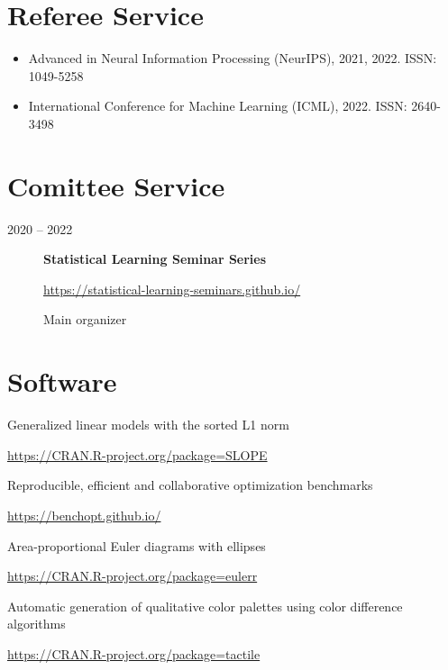 \documentclass[
  10pt,
  headsepline=true,
  english,
  DIV=12
]{scrartcl}
\renewcommand*{%
  \mkbibnamegiven
}[1]{\ifitemannotation{highlight}{\textbf{#1}}{#1}}
\renewcommand*{%
  \mkbibnamefamily
}[1]{\ifitemannotation{highlight}{\textbf{#1}}{#1}}
\begin{document}
\section{Referee Service}

\begin{itemize}
  \item Advanced in Neural Information Processing (NeurIPS), 2021, 2022. ISSN: 1049-5258
  \item International Conference for Machine Learning (ICML), 2022. ISSN: 2640-3498
\end{itemize}


\section{Comittee Service}

\begin{description}
  \item[2020 -- 2022]{
              \textbf{Statistical Learning Seminar Series}

              \url{https://statistical-learning-seminars.github.io/}

              Main organizer
        }
\end{description}

\section{Software}

\begin{description}[
    labelwidth = \widthof{qualpalr} + 1em,
    leftmargin = \widthof{qualpalr} + 1em,
  ]
  \item[SLOPE] {
    Generalized linear models with the sorted L1 norm

    \url{https://CRAN.R-project.org/package=SLOPE}
    }

    \item[benchopt]{
                Reproducible, efficient and collaborative optimization benchmarks

                \url{https://benchopt.github.io/}
          }

    \item[eulerr]{
                Area-proportional Euler diagrams with ellipses

                \url{https://CRAN.R-project.org/package=eulerr}
          }

  \item[qualpalr] {
    Automatic generation of qualitative color palettes using color difference
    algorithms

    \url{https://CRAN.R-project.org/package=tactile}
    }

\end{description}
\end{document}
